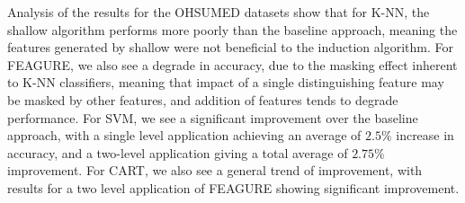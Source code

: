 \documentclass[twoside,11pt]{article}
\theoremstyle{definition}
\begin{document}
Analysis of the results for the OHSUMED datasets show that for K-NN, the shallow algorithm performs more poorly than the baseline approach, meaning the features generated by shallow were not beneficial to the induction algorithm. For FEAGURE, we also see a degrade in accuracy, due to the masking effect inherent to K-NN classifiers, meaning that impact of a single distinguishing feature may be masked by other features, and addition of features tends to degrade performance. For SVM, we see a significant improvement over the baseline approach, with a single level application achieving an average of $2.5\%$ increase in accuracy, and a two-level application giving a total average of $2.75\%$ improvement. For CART, we also see a general trend of improvement, with results for a two level application of FEAGURE showing significant improvement.

\end{document}
